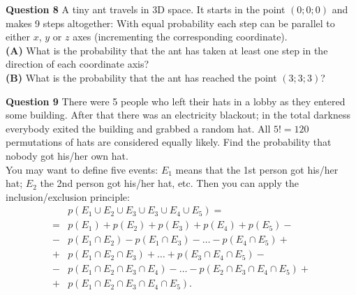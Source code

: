 \documentclass[jou]{apa6}
\begin{document}
\vspace{10pt}
{\bf Question 8} A tiny ant travels in 3D space. It starts in the point $(0;0;0)$ and 
makes 9 steps altogether: With equal probability 
each step can be parallel to either $x$, $y$ or $z$ axes (incrementing the corresponding coordinate).\\ 
{\bf (A)} What is the probability that the 
ant has taken at least one step in the direction of each coordinate axis?\\
{\bf (B)} What is the probability that the ant has reached the point $(3;3;3)$?

\vspace{10pt}
{\bf Question 9} There were 5 people who left their hats in a lobby as they entered some building. 
After that there was an electricity blackout; in the total darkness everybody exited the building and grabbed a random hat.
All $5!=120$ permutations of hats are considered equally likely. Find the probability that nobody got his/her
own hat.\\ 
You may want to define five events: $E_1$ means that the 1st person 
got his/her hat; $E_2$ \textendash{} the 2nd person got his/her hat, etc. 
Then you can apply the inclusion/exclusion principle:
\begin{align}
 & p(E_1 \cup E_2 \cup E_3 \cup E_3 \cup E_4 \cup E_5) = \nonumber \\
= & p(E_1) + p(E_2) + p(E_3) + p(E_4) + p(E_5) - \nonumber \\
- & p(E_1 \cap E_2) - p(E_1 \cap E_3) - \ldots - p(E_4 \cap E_5) + \nonumber \\
+ & p(E_1 \cap E_2 \cap E_3) + \ldots + p(E_3 \cap E_4 \cap E_5) - \nonumber \\
- & p(E_1 \cap E_2 \cap E_3 \cap E_4) - \ldots - p(E_2 \cap E_3 \cap E_4 \cap E_5) + \nonumber \\
+ & p(E_1 \cap E_2 \cap E_3 \cap E_4 \cap E_5). \nonumber
\end{align}
\end{document}
